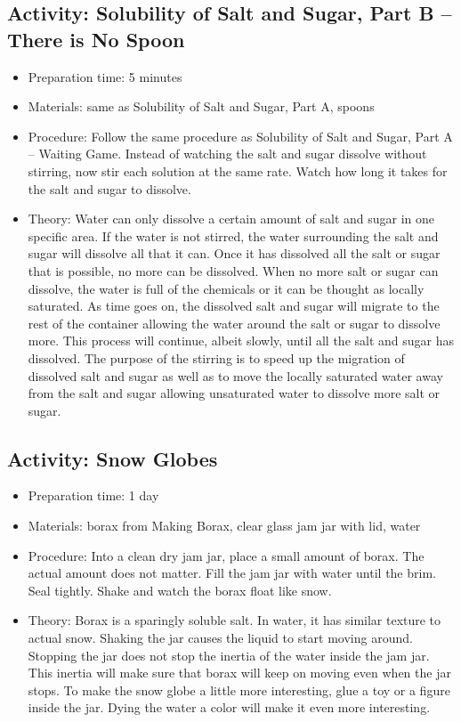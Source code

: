 \begin{itemize}
{\begin{itemize}
\begin{itemize}
{\subsection{Activity: Solubility of Salt and Sugar, Part B – There is No Spoon}
\begin{itemize}
\item{Preparation time: 5 minutes}
\item{Materials: same as Solubility of Salt and Sugar, Part A, spoons}
\item{Procedure: Follow the same procedure as Solubility of Salt and Sugar, Part A – Waiting Game. Instead of watching the salt and sugar dissolve without stirring, now stir each solution at the same rate. Watch how long it takes for the salt and sugar to dissolve.}
\item{Theory: Water can only dissolve a certain amount of salt and sugar in one specific area. If the water is not stirred, the water surrounding the salt and sugar will dissolve all that it can. Once it has dissolved all the salt or sugar that is possible, no more can be dissolved. When no more salt or sugar can dissolve, the water is full of the chemicals or it can be thought as locally saturated. As time goes on, the dissolved salt and sugar will migrate to the rest of the container allowing the water around the salt or sugar to dissolve more. This process will continue, albeit slowly, until all the salt and sugar has dissolved. The purpose of the stirring is to speed up the migration of dissolved salt and sugar as well as to move the locally saturated water away from the salt and sugar allowing unsaturated water to dissolve more salt or sugar.}
\end{itemize}

\subsection{Activity: Snow Globes}
\begin{itemize}
\item{Preparation time: 1 day}
\item{Materials: borax from Making Borax, clear glass jam jar with lid, water}
\item{Procedure: Into a clean dry jam jar, place a small amount of borax. The actual amount does not matter. Fill the jam jar with water until the brim. Seal tightly. Shake and watch the borax float like snow.}
\item{Theory: Borax is a sparingly soluble salt. In water, it has similar texture to actual snow. Shaking the jar causes the liquid to start moving around. Stopping the jar does not stop the inertia of the water inside the jam jar. This inertia will make sure that borax will keep on moving even when the jar stops. To make the snow globe a little more interesting, glue a toy or a figure inside the jar. Dying the water a color will make it even more interesting. }
\end{itemize}

}
\end{itemize}
\end{itemize}}
\end{itemize}
